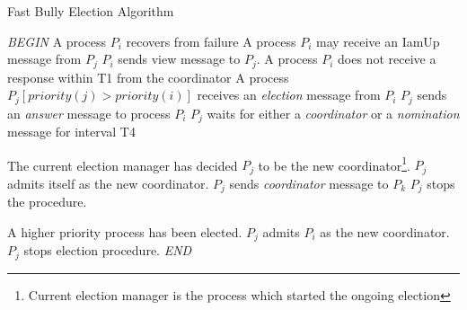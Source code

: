 \documentclass[dareport.tex]{subfiles}
\begin{document}
\begin{algorithm}
	\caption{Fast Bully Election Algorithm}
	\label{fast-bully-algorithm}
	\begin{algorithmic}[1]
		\BState \emph{BEGIN}
		\State A process $P_{i}$ recovers from failure
			\State\indent{}
		\State A process $P_{i}$ may receive an IamUp message from $P_{j}$
			\State\indent $P_{i}$ sends view message to $P_{j}$.
		\State A process $P_{i}$ does not receive a response within T1 from the coordinator
			\State\indent{}
		\State A process $P_{j} \left[priority(j) > priority(i)\right]$ receives an \emph{election} message from $P_{i}$
			\State\indent $P_{j}$ sends an \emph{answer} message to process $P_{i}$
			\State\indent $P_{j}$ waits for either a \emph{coordinator} or a \emph{nomination} message for interval T4
			\State{}
				\State\indent\indent{}
			
			
			\Comment The current election manager has decided $P_{j}$ to be the new coordinator\footnote{Current election manager is the process which started the ongoing election}.
				\State\indent $P_{j}$ admits itself as the new coordinator.
				\State{}
					\State\indent\indent $P_{j}$ sends \emph{coordinator} message to $P_{k}$
					\State\indent\indent $P_{j}$ stops the procedure.
			
			\Comment A higher priority process has been elected.
				\State\indent $P_{j}$ admits $P_{i}$ as the new coordinator.
				\State\indent $P_{j}$ stops election procedure.
		\BState \emph{END}
	\end{algorithmic}
\end{algorithm}
\end{document}
